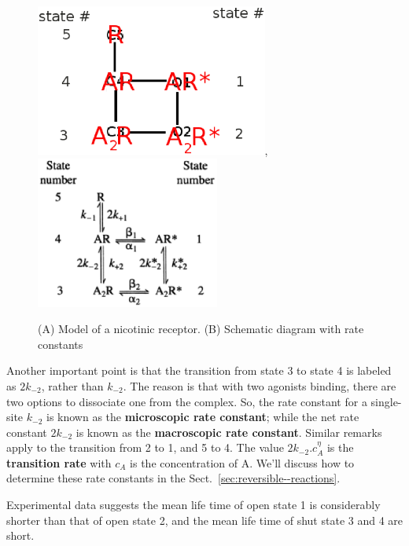 \begin{figure}[hbt]
  \centerline{\includegraphics[height=5cm,
    angle=0]{./images/state_nicotinic_receptor.eps},\includegraphics[height=5cm,
    angle=0]{./images/5state_model.eps}}
  \caption{(A) Model of a nicotinic receptor. (B) Schematic diagram
    with rate constants}
  \label{fig:nicotinic_receptor}
\end{figure}

Another important point is that the transition from state 3 to state 4
is labeled as $2k_{-2}$, rather than $k_{-2}$. The reason is that with
two agonists binding, there are two options to dissociate one from the
complex. So, the rate constant for a single-site $k_{-2}$ is known as
the {\bf microscopic rate constant}; while the net rate constant
$2k_{-2}$ is known as the {\bf macroscopic rate constant}. Similar
remarks apply to the transition from 2 to 1, and 5 to 4. The value
$2k_{-2}.c_A^\eta$ is the {\bf transition rate} with $c_A$ is the
concentration of A. We'll discuss how to determine these rate
constants in the Sect.~\ref{sec:reversible--reactions}.

Experimental data suggests the mean life time of open state 1 is
considerably shorter than that of open state 2, and the mean life time
of shut state 3 and 4 are short.

